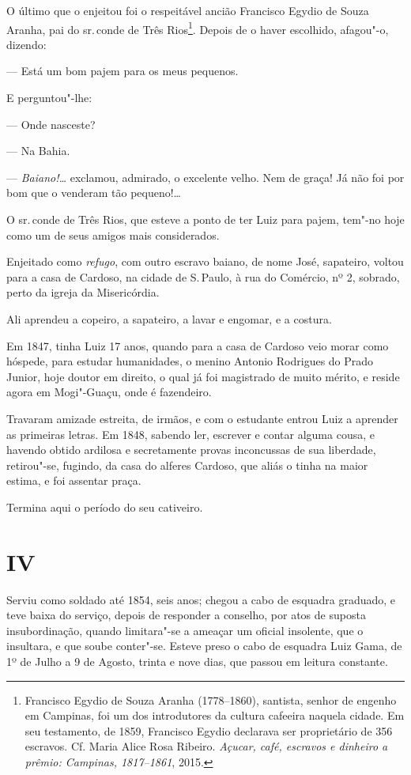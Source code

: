 O último que o enjeitou foi o respeitável ancião Francisco Egydio de
Souza Aranha, pai do sr.\,conde de Três Rios\footnote{Francisco Egydio
  de Souza Aranha (1778--1860), santista, senhor de engenho em Campinas,
  foi um dos introdutores da cultura cafeeira naquela cidade. Em seu
  testamento, de 1859, Francisco Egydio declarava ser proprietário de
  356 escravos. Cf. Maria Alice Rosa Ribeiro. \emph{Açucar, café,
  escravos e dinheiro a prêmio: Campinas, 1817--1861}, 2015.}. Depois de o
haver escolhido, afagou"-o, dizendo:

--- Está um bom pajem para os meus pequenos.

E perguntou"-lhe:

--- Onde nasceste?

--- Na Bahia.

--- \emph{Baiano!\ldots{}} exclamou, admirado, o excelente velho. Nem de
graça! Já não foi por bom que o venderam tão pequeno!\ldots{}

O sr.\,conde de Três Rios, que esteve a ponto de ter Luiz para pajem,
tem"-no hoje como um de seus amigos mais considerados.

Enjeitado como \emph{refugo}, com outro escravo baiano, de nome José,
sapateiro, voltou para a casa de Cardoso, na cidade de S.\,Paulo, à rua
do Comércio, nº 2, sobrado, perto da igreja da Misericórdia.

Ali aprendeu a copeiro, a sapateiro, a lavar e engomar, e a costura.

Em 1847, tinha Luiz 17 anos, quando para a casa de Cardoso veio morar
como hóspede, para estudar humanidades, o menino Antonio Rodrigues do
Prado Junior, hoje doutor em direito, o qual já foi magistrado de muito
mérito, e reside agora em Mogi"-Guaçu, onde é fazendeiro.

Travaram amizade estreita, de irmãos, e com o estudante entrou Luiz a
aprender as primeiras letras. Em 1848, sabendo ler, escrever e contar
alguma cousa, e havendo obtido ardilosa e secretamente provas
inconcussas de sua liberdade, retirou"-se, fugindo, da casa do alferes
Cardoso, que aliás o tinha na maior estima, e foi assentar praça.

Termina aqui o período do seu cativeiro.

\section*{IV}

Serviu como soldado até 1854, seis anos; chegou a cabo de esquadra
graduado, e teve baixa do serviço, depois de responder a conselho, por
atos de suposta insubordinação, quando limitara"-se a ameaçar um oficial
insolente, que o insultara, e que soube conter"-se. Esteve preso o cabo
de esquadra Luiz Gama, de 1º de Julho a 9 de Agosto, trinta e nove dias,
que passou em leitura constante.

